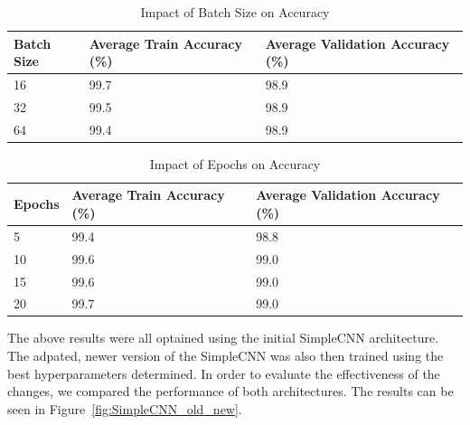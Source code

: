 \begin{table}[ht]
\caption{Impact of Batch Size on Accuracy}\label{table:batch-size}
\centering
\begin{tabular}{lll}
  \toprule
  Batch Size & Average Train Accuracy (\%) & Average Validation Accuracy (\%) \\
  \midrule
  16 & 99.7 & 98.9 \\
  32 & 99.5 & 98.9 \\
  64 & 99.4 & 98.9 \\
  \bottomrule
\end{tabular}
\end{table}

\begin{table}[ht]
\caption{Impact of Epochs on Accuracy}\label{table:epochs}
\centering
\begin{tabular}{lll}
  \toprule
  Epochs & Average Train Accuracy (\%) & Average Validation Accuracy (\%) \\
  \midrule
  5  & 99.4 & 98.8 \\
  10 & 99.6 & 99.0 \\
  15 & 99.6 & 99.0 \\
  20 & 99.7 & 99.0 \\
  \bottomrule
\end{tabular}
\end{table}

The above results were all optained using the initial SimpleCNN architecture. The adpated, newer version of the SimpleCNN was also then trained using the best hyperparameters determined. In order to evaluate the effectiveness of the changes, we compared the performance of both architectures. The results can be seen in Figure~\ref{fig:SimpleCNN_old_new}.

